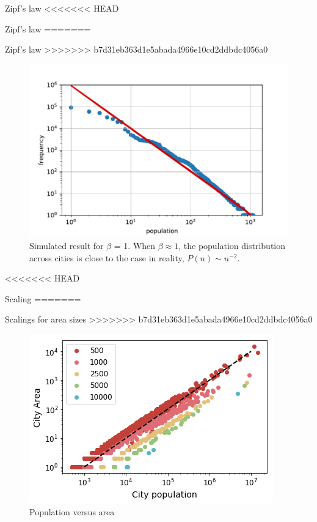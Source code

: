 \documentclass{beamer}
\begin{document}
\begin{frame}{Zipf's law}
<<<<<<< HEAD
\begin{frame}{Zipf's law}
=======
\begin{frame}{Zipf's law }
>>>>>>> b7d31eb363d1e5abada4966e10cd2ddbdc4056a0
  \begin{figure}
    \includegraphics[width = 0.8\linewidth]{pics/zipf.pdf}
    \caption{Simulated result for $\beta$ = 1. When $\beta\approx 1$, the population distribution across cities is close to the case in reality, $P(n)\sim n^{-2}$.}
  \end{figure}

\end{frame}

<<<<<<< HEAD
\begin{frame}{Scaling}
=======
\begin{frame}{Scalings for area sizes}
>>>>>>> b7d31eb363d1e5abada4966e10cd2ddbdc4056a0
  \begin{figure}
    \includegraphics[width = 0.8\linewidth]{pics/pop-area.png}
    \caption{Population versus area}
  \end{figure}
\end{frame}


\end{frame}
\end{frame}
\end{frame}
\end{document}
